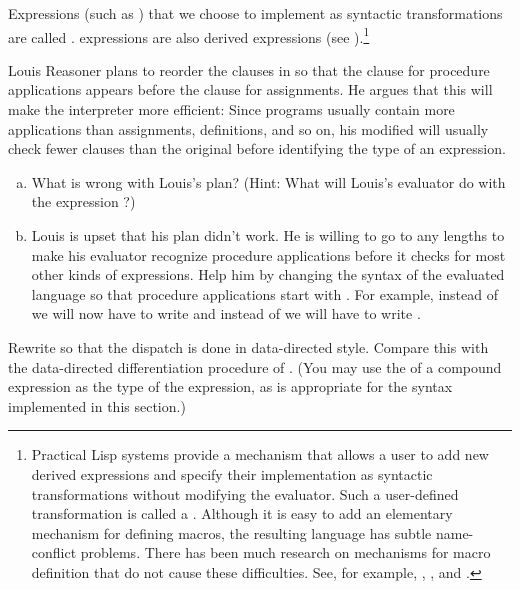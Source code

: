 \noindent
Expressions (such as ) that we choose to implement as syntactic
transformations are called .  
expressions are also derived expressions (see
).\footnote{Practical Lisp systems provide a mechanism that allows a user
to add new derived expressions and specify their implementation as syntactic
transformations without modifying the evaluator.  Such a user-defined
transformation is called a .  Although it is easy to add an
elementary mechanism for defining macros, the resulting language has subtle
name-conflict problems.  There has been much research on mechanisms for macro
definition that do not cause these difficulties.  See, for example, ,
, and .}

\begin{exerciseGroup}
\label{Exercise 4.2}
 Louis Reasoner plans to reorder the
 clauses in  so that the clause for procedure
applications appears before the clause for assignments.  He argues that this
will make the interpreter more efficient: Since programs usually contain more
applications than assignments, definitions, and so on, his modified 
will usually check fewer clauses than the original  before
identifying the type of an expression.

\begin{enumerate}[a.]

\item
What is wrong with Louis's plan?  (Hint: What will Louis's evaluator do with
the expression ?)

\item
Louis is upset that his plan didn't work.  He is willing to go to any lengths
to make his evaluator recognize procedure applications before it checks for
most other kinds of expressions.  Help him by changing the syntax of the
evaluated language so that procedure applications start with .  For
example, instead of  we will now have to write  and instead of  we will have to write .

\end{enumerate}

\label{Exercise 4.3}
 Rewrite  so that the
dispatch is done in data-directed style.  Compare this with the data-directed
differentiation procedure of .  (You may use the 
of a compound expression as the type of the expression, as is appropriate for
the syntax implemented in this section.)


\end{exerciseGroup}
